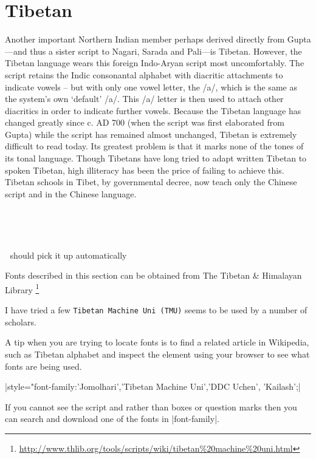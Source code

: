 \section{Tibetan}

Another important Northern Indian member perhaps
derived directly from Gupta---and thus a sister script to Nagari,
Sarada and Pali---is Tibetan. However, the Tibetan
language wears this foreign Indo-Aryan script most uncomfortably.\cite{writing}
The script retains the Indic consonantal alphabet with diacritic
attachments to indicate vowels – but with only one vowel
letter, the /a/, which is the same as the system’s own ‘default’ /a/.
This /a/ letter is then used to attach other diacritics in order to
indicate further vowels. Because the Tibetan language has
changed greatly since c. AD 700 (when the script was first elaborated
from Gupta) while the script has remained almost
unchanged, Tibetan is extremely difficult to read today. Its
greatest problem is that it marks none of the tones of its tonal
language. Though Tibetans have long tried to adapt written
Tibetan to spoken Tibetan, high illiteracy has been the price of
failing to achieve this. Tibetan schools in Tibet, by governmental
decree, now teach only the Chinese script and in the Chinese
language.

^^A\newfontfamily{}

^^A\newfontfamily{}

^^A should pick it up automatically \tibetan

Fonts described in this section can be obtained from The Tibetan \& Himalayan Library
\footnote{\url{http://www.thlib.org/tools/scripts/wiki/tibetan\%20machine\%20uni.html}  }

I have tried a few \texttt{Tibetan Machine Uni (TMU)} seems to be used by a number of scholars. 

A tip when you are trying to locate fonts is to find a related article in Wikipedia, such as Tibetan alphabet and inspect the element using your browser to see what fonts are being used.


|style="font-family:'Jomolhari','Tibetan Machine Uni','DDC Uchen', 'Kailash';| 


If you cannot see the script and rather than boxes or question marks then you can search and download one of the fonts in |font-family|.

\def\tibetandefaultfont#1{\newfontfamily\tibetan[Language=Tibetan]{#1}}

\cxset{tibetan font/.code=\tibetandefaultfont{#1}}


